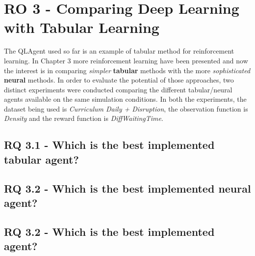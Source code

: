 \section{RO 3 - Comparing Deep Learning with Tabular Learning}

The QLAgent used so far is an example of tabular method for reinforcement learning.
In Chapter 3 more reinforcement learning have been presented and now the interest is in comparing \textit{simpler} \textbf{tabular} methods with the more \textit{sophisticated} \textbf{neural} methods.
In order to evaluate the potential of those approaches, two distinct experiments were conducted comparing the different tabular/neural agents available on the same simulation conditions.
In both the experiments, the dataset being used is \textit{Curriculum Daily + Disruption}, the observation function is \textit{Density} and the reward function is \textit{DiffWaitingTime}.

\subsection{RQ 3.1 - Which is the best implemented tabular agent?}


\subsection{RQ 3.2 - Which is the best implemented neural agent?}


\subsection{RQ 3.2 - Which is the best implemented agent?}



